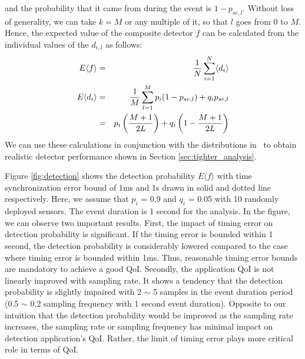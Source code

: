 and the probability that it came from during the event is $1-p_{se,l}$. Without loss of generality, we can take $k=M$ or any multiple of it, so that $l$ goes from $0$ to $M$. Hence, the expected value of the composite detector $f$ can be calculated from the individual values of the $d_{i,l}$ as follows:
\begin{eqnarray}
  E\langle f\rangle &=& {1\over N}\sum_{i=1}^N\langle d_i \rangle\nonumber\\
  E\langle d_i \rangle&=& {1\over M}\sum_{l=1}^M p_i(1-p_{se,l})+q_ip_{se,l}\nonumber\\
  &=& p_i\left( {M+1 \over 2L}\right)+q_i\left(1- {M+1 \over 2L}\right)\label{eqn:heterog_detector_mean}
\end{eqnarray}
We can use these calculations in conjunction with the distributions
in~\cite{timing-error} to obtain realistic detector performance
shown in Section \ref{sec:tighter_analysis}.

Figure \ref{fig:detection} shows the detection probability $E\langle
f\rangle$ with time synchronization error bound of 1ms and 1s drawn
in solid and dotted line respectively. Here, we assume that $p_i$ =
0.9 and $q_i$ = 0.05 with 10 randomly deployed sensors. The event
duration is 1 second for the analysis. In the figure, we can observe
two important results. First, the impact of timing error on
detection probability is significant. If the timing error is bounded
within 1 second, the detection probability is considerably lowered
compared to the case where timing error is bounded within 1ms. Thus,
reasonable timing error bounds are mandatory to achieve a good QoI.
Secondly, the application QoI is not linearly improved with sampling
rate. It shows a tendency that the detection probability is slightly
impaired with 2 $\sim$ 5 samples in the event duration period (0.5
$\sim$ 0.2 sampling frequency with 1 second event duration).
Opposite to our intuition that the detection probability would be
improved as the sampling rate increases, the sampling rate or
sampling frequency has minimal impact on detection application's
QoI. Rather, the limit of timing error plays more critical role in
terms of QoI.

